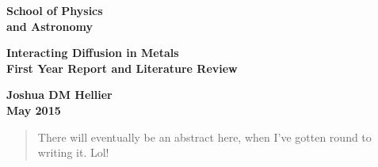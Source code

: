 \documentclass[a4paper,12pt]{article}
\begin{document}
\epsfxsize=40mm                         %
\begin{minipage}[b]{110mm}
        {\Huge\bf School of Physics \\and Astronomy
        \vspace*{17mm}}
\end{minipage}
\hfill
\begin{minipage}[t]{40mm}               
\end{minipage}
\par\noindent                                           %
\vspace*{2cm}
\begin{center}
        \Large\bf Interacting Diffusion in Metals\\
        \Large\bf First Year Report and Literature Review
\end{center}
\vspace*{1.5cm}
\begin{center}
        \bf Joshua DM Hellier\\                 %
        May 2015                         %
\end{center}
\vspace*{5mm}
%
%                       
\begin{abstract}
        There will eventually be an abstract here, when I've gotten round to writing it. Lol!
\end{abstract}
\end{document}
